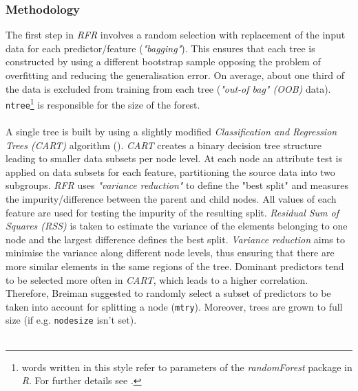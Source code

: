 \documentclass[a4paper,reqno,]{article}
\begin{document}
\subsubsection{Methodology}
\label{sssec:meth}
The first step in \textit{RFR} involves a random selection with replacement of the input data for each predictor/feature (\textit{"bagging"}). This ensures that each tree is constructed by using a different bootstrap sample opposing the problem of overfitting 
and reducing the generalisation error. On average, about one third of the data is excluded from training from each tree (\textit{"out-of bag" (OOB)} data). \texttt{ntree}\footnote{words written in this style refer to parameters of the \textit{randomForest} package in \textit{R}. For further details see \cite{rf_manual}.} is responsible for the size of the forest.  
\\
\\
A single tree is built by using a slightly modified \textit{Classification and Regression Trees (CART)} algorithm (\cite{dtl_wiki}). \textit{CART} creates a binary decision tree structure leading to smaller data subsets per node level. At each node an attribute test is applied on data subsets for each feature, partitioning the source data into two subgroups. \textit{RFR} uses \textit{"variance reduction"} to define the "best split" and measures the impurity/difference between the parent and child nodes. All values of each feature are used for testing the impurity of the resulting split. \textit{Residual Sum of Squares (RSS)} is taken to estimate the variance of the elements belonging to one node and the largest difference defines the best split. \textit{Variance reduction} aims to minimise the variance along different node levels, thus ensuring that there are more similar elements in the same regions of the tree. Dominant predictors tend to be selected more often in \textit{CART}, which leads to a higher correlation. Therefore, Breiman suggested to randomly select a subset of predictors to be taken into account for splitting a node (\texttt{mtry}). Moreover, trees are grown to full size (if e.g. \texttt{nodesize} isn't set).
\\
\\
\end{document}
